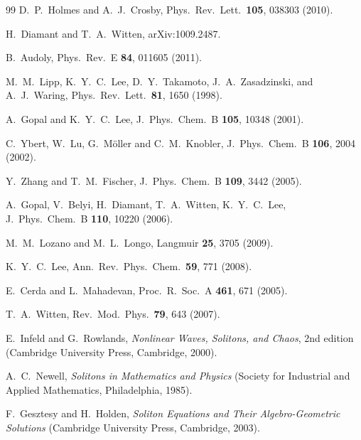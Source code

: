 \documentclass[prl,twocolumn,showpacs]{revtex4}
\begin{document}
\begin{thebibliography}{99}
D.\ P.\ Holmes and A.\ J.\ Crosby,
Phys.\ Rev.\ Lett.\ \textbf{105}, 038303 (2010).

H.\ Diamant and T.\ A.\ Witten,
arXiv:1009.2487.

B.\ Audoly,
Phys.\ Rev.\ E \textbf{84}, 011605 (2011).

M.\ M.\ Lipp, K.\ Y.\ C.\ Lee, D.\ Y.\ Takamoto,
J.\ A.\ Zasadzinski, and A.\ J.\ Waring,
Phys.\ Rev.\ Lett.\ \textbf{81}, 1650 (1998).

A.\ Gopal and K.\ Y.\ C.\ Lee,
J.\ Phys.\ Chem.\ B \textbf{105}, 10348 (2001).

C.\ Ybert, W.\ Lu, G.\ M\"oller and C.\ M.\ Knobler,
J.\ Phys.\ Chem.\ B \textbf{106}, 2004 (2002).

Y.\ Zhang and T.\ M.\ Fischer,
J.\ Phys.\ Chem.\ B \textbf{109}, 3442 (2005).

A.\ Gopal, V.\ Belyi, H.\ Diamant, T.\ A.\ Witten, K.\ Y.\ C.\ Lee,
J.\ Phys.\ Chem.\ B \textbf{110}, 10220 (2006).

M.\ M.\ Lozano and M.\ L.\ Longo,
Langmuir \textbf{25}, 3705 (2009).

K.\ Y.\ C.\ Lee,
Ann.\ Rev.\ Phys.\ Chem.\ \textbf{59}, 771 (2008).

E.\ Cerda and L.\ Mahadevan,
Proc.\ R.\ Soc.\ A \textbf{461}, 671 (2005).

T.\ A.\ Witten, Rev.\ Mod.\ Phys.\ \textbf{79}, 643 (2007).

E.\ Infeld and G.\ Rowlands,
\textit{Nonlinear Waves, Solitons, and Chaos}, 2nd edition
(Cambridge University Press, Cambridge, 2000).

A.\ C.\ Newell, \textit{Solitons in Mathematics and Physics}
(Society for Industrial and Applied Mathematics, Philadelphia, 1985).

F.\ Gesztesy and H.\ Holden,
\textit{Soliton Equations and Their Algebro-Geometric Solutions}
(Cambridge University Press, Cambridge, 2003).

\end{thebibliography}
\end{document}
